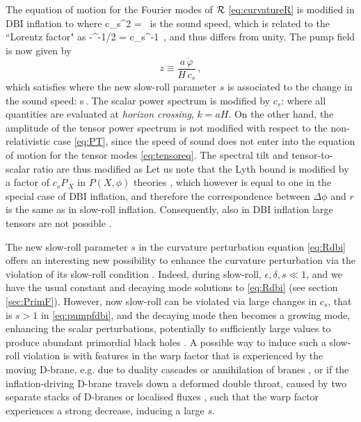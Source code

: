 The equation of motion for the Fourier modes of $\cal R$ \eqref{eq:curvatureR} is modified in DBI inflation to 
\be
\label{eq:Rdbi}
\setlength\fboxsep{0.25cm}
\setlength\fboxrule{0.4pt}
\ee
where 
 \be
 c_s^2 =  \,
  \ee
  is the sound speed, which is related to the ``Lorentz factor" as
  \be
  \gamma \equiv {}-\rp^{-1/2} = c_s^{-1} \,,
  \ee
   and thus differs from unity. The pump field is now given by  
$$z\equiv \frac{a\,\dot\varphi}{H\,c_s}\,,$$ 
 which satisfies
\be
\label{eq:pumpfdbi}
\setlength\fboxsep{0.25cm}
\setlength\fboxrule{0.4pt}
\ee
where the new slow-roll parameter $s$ is associated to the change in the sound speed:
\be
s\equiv {}\,.
\ee
The scalar power spectrum is  modified by $c_s$:
\be
\setlength\fboxsep{0.25cm}
\setlength\fboxrule{0.4pt}
\ee
where all quantities are evaluated at {\em horizon crossing}, $k=aH$. On the other hand, the  amplitude of the tensor power spectrum is not modified with respect to the non-relativistic case \eqref{eq:PT}, since the speed of sound does not enter into the equation of motion for the tensor modes \eqref{eq:tensoreq}. 
The spectral tilt and tensor-to-scalar ratio are thus modified as
\be
\setlength\fboxsep{0.25cm}
\setlength\fboxrule{0.4pt}
\ee
Let us note that the Lyth bound is modified by a factor of $c_sP_{\,X}$ in $P(X,  \phi)$ theories \cite{Baumann:2006cd}, which however is equal to one in the special case of DBI inflation, and therefore the correspondence between $\Delta\phi$ and $r$ is the same as in slow-roll inflation. Consequently, also in DBI inflation large tensors are not possible \cite{Baumann:2006cd,Lidsey:2007gq}. 

The new slow-roll parameter $s$ in the curvature perturbation equation \eqref{eq:Rdbi} offers an interesting new possibility  to enhance the curvature perturbation via the violation of its slow-roll condition \cite{Ozsoy:2018flq}. Indeed, during slow-roll,  $\epsilon, \delta, s \ll 1$, and we have the usual constant and decaying mode solutions to \eqref{eq:Rdbi} (see section \ref{sec:PrimF}). However, now slow-roll can be violated via large changes in $c_s$, that is $s>1$ in \eqref{eq:pumpfdbi}, and the decaying mode then becomes a growing mode, enhancing the scalar perturbations, potentially to sufficiently large values to produce abundant primordial black holes \cite{Ozsoy:2018flq}. A possible way to induce such a slow-roll violation is with features in the warp factor that is experienced by the moving  D-brane, e.g. due to duality cascades or annihilation of branes \cite{Hailu:2006uj,Miranda:2012rm}, or if the inflation-driving D-brane travels down a deformed double throat, caused by two separate stacks of D-branes or localised fluxes \cite{Franco:2005fd,Cascales:2005rj}, such that the warp factor experiences a strong decrease, inducing a large $s$.

